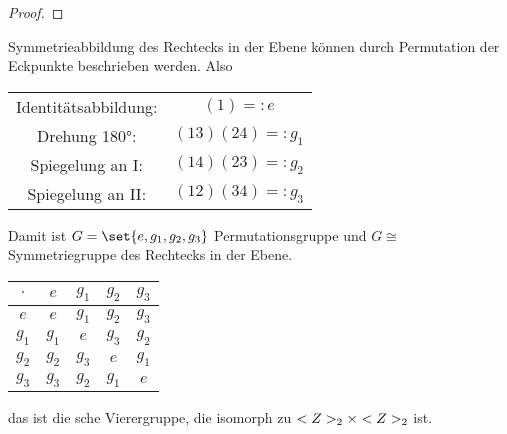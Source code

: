 \begin{proof}
	\sest
\end{proof}
\begin{example}
	Symmetrieabbildung des Rechtecks in der Ebene
%		
%			
%			
%			
%			
%		
können durch Permutation der Eckpunkte beschrieben werden. Also
\begin{center}
	\begin{tabular}{|c|c|}
		Identitätsabbildung: & $(1) =: e$\\
		Drehung 180°: & $(13)(24) =: g_1$\\
		Spiegelung an I: & $(14)(23) =: g_2$\\
		Spiegelung an II: & $(12)(34) =: g_3$  
	\end{tabular}
\end{center}
Damit ist $G = \set{e,g_1,g_2,g_3}$ Permutationsgruppe und $G \cong$ Symmetriegruppe des Rechtecks in der Ebene.
\begin{center}
	\begin{tabular}{c|cccc}
		$\cdot$ & $e$ 	& $g_1$ & $g_2$ & $g_3$\\
		\hline
		$e$   	& $e$   & $g_1$ & $g_2$ & $g_3$\\
		$g_1$ 	& $g_1$ & $e$   & $g_3$ & $g_2$\\
		$g_2$ 	& $g_2$ & $g_3$ & $e$   & $g_1$\\
		$g_3$ 	& $g_3$ & $g_2$ & $g_1$ & $e$\\
	\end{tabular}
\end{center}
das ist die sche Vierergruppe, die isomorph zu $<Z>_2 \times <Z>_2$ ist.
\end{example}
